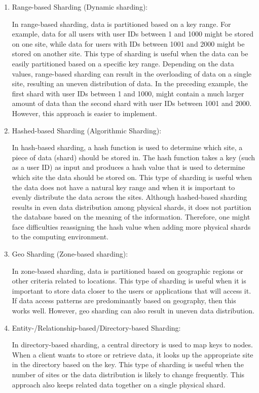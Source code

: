 \begin{enumerate}
\item Range-based Sharding (Dynamic sharding):

In range-based sharding, data is partitioned based on a key range. For example, data for all users with user IDs between 1 and 1000 might be stored on one site, while data for users with IDs between 1001 and 2000 might be stored on another site. This type of sharding is useful when the data can be easily partitioned based on a specific key range. Depending on the data values, range-based sharding can result in the overloading of data on a single site, resulting an uneven distribution of data. In the preceding example, the first shard with user IDs between 1 and 1000, might contain a much larger amount of data than the second shard with user IDs between 1001 and 2000. However, this approach is easier to implement.

\item Hashed-based Sharding (Algorithmic Sharding):

In hash-based sharding, a hash function is used to determine which site, a piece of data (shard) should be stored in. The hash function takes a key (such as a user ID) as input and produces a hash value that is used to determine which site the data should be stored on. This type of sharding is useful when the data does not have a natural key range and when it is important to evenly distribute the data across the sites. Although hashed-based sharding results in even data distribution among physical shards, it does not partition the database based on the meaning of the information. Therefore, one might face difficulties reassigning the hash value when adding more physical shards to the computing environment.

\item Geo Sharding (Zone-based sharding): 

In zone-based sharding, data is partitioned based on geographic regions or other criteria related to locations. This type of sharding is useful when it is important to store data closer to the users or applications that will access it. If data access patterns are predominantly based on geography, then this works well. However, geo sharding can also result in uneven data distribution.

\item Entity-/Relationship-based/Directory-based Sharding:

In directory-based sharding, a central directory is used to map keys to nodes. When a client wants to store or retrieve data, it looks up the appropriate site in the directory based on the key. This type of sharding is useful when the number of sites or the data distribution is likely to change frequently. This approach also keeps related data together on a single physical shard.


\end{enumerate}
